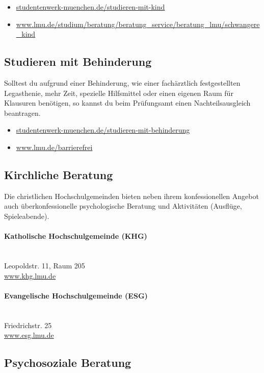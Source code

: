\documentclass[twoside,12pt,parskip=half-]{scrartcl}
\begin{document}
\begin{itemize}
	\item \url{studentenwerk-muenchen.de/studieren-mit-kind}
	\item \url{www.lmu.de/studium/beratung/beratung_service/beratung_lmu/schwangere_kind}
\end{itemize}

\subsection{Studieren mit Behinderung}

Solltest du aufgrund einer Behinderung, wie einer fachärztlich festgestellten Legasthenie, mehr Zeit, spezielle Hilfsmittel oder einen eigenen Raum für Klausuren benötigen, so kannst du beim Prüfungsamt einen Nachteilsausgleich beantragen.

\begin{itemize}
	\item \url{studentenwerk-muenchen.de/studieren-mit-behinderung}
	\item \url{www.lmu.de/barrierefrei}
\end{itemize}



\subsection{Kirchliche Beratung}
Die christlichen Hochschulgemeinden bieten neben ihrem konfessionellen Angebot auch überkonfessionelle psychologische Beratung und Aktivitäten (Ausflüge, Spieleabende).

\paragraph{Katholische Hochschulgemeinde (KHG)}\hfill\\
Leopoldstr. 11, Raum 205\\
\url{www.khg.lmu.de}

\paragraph{Evangelische Hochschulgemeinde (ESG)}\hfill\\
Friedrichstr. 25\\
\url{www.esg.lmu.de}



\subsection{Psychosoziale Beratung}
\end{document}
